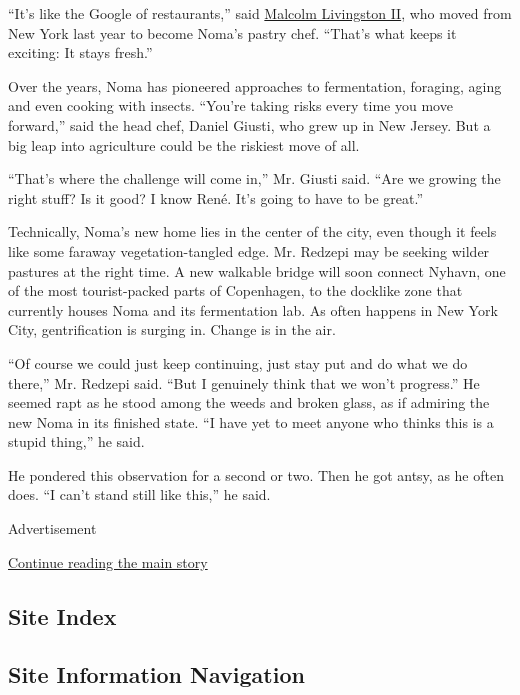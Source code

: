 ``It's like the Google of restaurants,'' said
\href{http://www.nytimes3xbfgragh.onion/2014/11/05/dining/malcolm-livingston-ii-prepares-to-move-to-noma-from-wd-50-and-the-bronx-.html}{Malcolm
Livingston II}, who moved from New York last year to become Noma's
pastry chef. ``That's what keeps it exciting: It stays fresh.''

Over the years, Noma has pioneered approaches to fermentation, foraging,
aging and even cooking with insects. ``You're taking risks every time
you move forward,'' said the head chef, Daniel Giusti, who grew up in
New Jersey. But a big leap into agriculture could be the riskiest move
of all.

``That's where the challenge will come in,'' Mr. Giusti said. ``Are we
growing the right stuff? Is it good? I know René. It's going to have to
be great.''

Technically, Noma's new home lies in the center of the city, even though
it feels like some faraway vegetation-tangled edge. Mr. Redzepi may be
seeking wilder pastures at the right time. A new walkable bridge will
soon connect Nyhavn, one of the most tourist-packed parts of Copenhagen,
to the docklike zone that currently houses Noma and its fermentation
lab. As often happens in New York City, gentrification is surging in.
Change is in the air.

``Of course we could just keep continuing, just stay put and do what we
do there,'' Mr. Redzepi said. ``But I genuinely think that we won't
progress.'' He seemed rapt as he stood among the weeds and broken glass,
as if admiring the new Noma in its finished state. ``I have yet to meet
anyone who thinks this is a stupid thing,'' he said.

He pondered this observation for a second or two. Then he got antsy, as
he often does. ``I can't stand still like this,'' he said.

Advertisement

\protect\hyperlink{after-bottom}{Continue reading the main story}

\hypertarget{site-index}{%
\subsection{Site Index}\label{site-index}}

\hypertarget{site-information-navigation}{%
\subsection{Site Information
Navigation}\label{site-information-navigation}}

